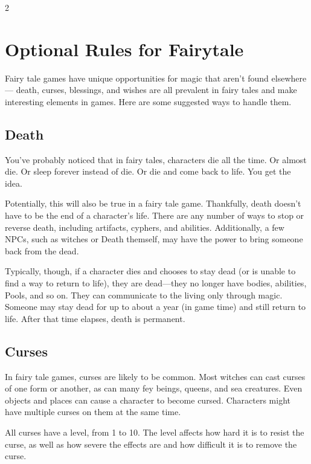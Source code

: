 \begin{multicols}{2}

\chapter{Optional Rules for Fairytale}

Fairy tale games have unique opportunities for magic that aren’t found elsewhere— death, curses, blessings, and wishes are all prevalent in fairy tales and make interesting elements in games. Here are some suggested ways to handle them.

\section{Death}

You’ve probably noticed that in fairy tales, characters die all the time. Or almost die. Or sleep forever instead of die. Or die and come back to life. You get the idea.

Potentially, this will also be true in a fairy tale game. Thankfully, death doesn’t have to be the end of a character’s life. There are any number of ways to stop or reverse death, including artifacts, cyphers, and abilities. Additionally, a few NPCs, such as witches or Death themself, may have the power to bring someone back from the dead.

Typically, though, if a character dies and chooses to stay dead (or is unable to find a way to return to life), they are dead—they no longer have bodies, abilities, Pools, and so on. They can communicate to the living only through magic. Someone may stay dead for up to about a year (in game time) and still return to life. After that time elapses, death is permanent.

\section{Curses}

In fairy tale games, curses are likely to be common. Most witches can cast curses of one form or another, as can many fey beings, queens, and sea creatures. Even objects and places can cause a character to become cursed. Characters might have multiple curses on them at the same time.

All curses have a level, from 1 to 10. The level affects how hard it is to resist the curse, as well as how severe the effects are and how difficult it is to remove the curse.


\end{multicols}
